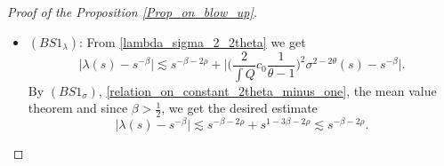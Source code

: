 \documentclass[16pt,english, oneside,reqno]{smfart}
\begin{document}
\begin{proof}[Proof of the Proposition \ref{Prop_on_blow_up}]
\begin{itemize}
The initial condition \eqref{init_cond_sigma_b} on $\sigma_0$, the mean value theorem for the function $x \mapsto x^{\frac{1}{1-\beta}}$, $\frac{1}{1-\beta} > 2$ and the integration of the previous result yields
\begin{equation}
    \Big\lvert \sigma^{\frac{1}{1-\beta}}(s) - (1-\beta)^{-\frac{1}{1-\beta}} s\Big\rvert \lesssim s^{1-2\rho} \iff \Bigg\lvert \Bigg( \frac{(1-\beta)\sigma(s)}{s^{1-\beta}}\Bigg)^{\frac{1}{1-\beta}} -1  \Bigg\rvert \lesssim s^{-2\rho}.
\end{equation}
By the mean value theorem as previously, we find 
\begin{equation}
    \Bigg\lvert  \frac{(1-\beta)\sigma(s)}{s^{1-\beta}}  -1  \Bigg\rvert \lesssim s^{-2\rho} \iff \Big\lvert \sigma(s) - \frac{1}{1-\beta}s^{1-\beta} \Big\rvert \lesssim s^{1-\beta-2\rho}.
\end{equation}

\item $(BS1_\lambda)$: From \eqref{lambda_sigma_2_2theta} we get
\begin{equation}
    \Big\lvert \lambda(s) - s^{-\beta} \Big\rvert \lesssim s^{-\beta-2\rho}  + \Bigg\lvert  \Bigg( \frac{2}{\int Q}c_0 \frac{1}{\theta -1} \Bigg)^2 \sigma^{2-2\theta}(s) - s^{-\beta} \Bigg\rvert.
\end{equation}
By $(BS1_{\sigma})$, \eqref{relation_on_constant_2theta_minus_one}, the mean value theorem and since $\beta > \frac{1}{2}$, we get the desired estimate
\begin{equation}
    \Big\lvert \lambda(s) - s^{-\beta} \Big\rvert \lesssim s^{-\beta-2\rho} + s^{1-3\beta-2\rho} \lesssim s^{-\beta-2\rho}.
\end{equation}


\end{itemize}
\end{proof}
\end{document}

